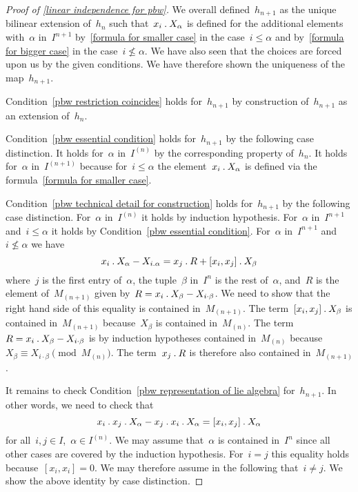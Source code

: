 \begin{proof}[Proof of \cref{linear independence for pbw}]
  We overall defined~$h_{n+1}$ as the unique bilinear extension of~$h_n$ such that~$x_i \mathbin{.} X_\alpha$ is defined for the additional elements with~$\alpha$ in~$I^{n+1}$ by~\eqref{formula for smaller case} in the case~$i \leq \alpha$ and by~\eqref{formula for bigger case} in the case~$i \nleq \alpha$.
  We have also seen that the choices are forced upon us by the given conditions.
  We have therefore shown the uniqueness of the map~$h_{n+1}$.
  
  Condition~\ref{pbw restriction coincides} holds for~$h_{n+1}$ by construction of~$h_{n+1}$ as an extension of~$h_n$.

  Condition~\ref{pbw essential condition} holds for~$h_{n+1}$ by the following case distinction.
  It holds for~$\alpha$ in~$I^{(n)}$ by the corresponding property of~$h_n$.
  It holds for~$\alpha$ in~$I^{(n+1)}$ because for~$i \leq \alpha$ the element~$x_i \mathbin{.} X_\alpha$ is defined via the formula~\eqref{formula for smaller case}. 

  Condition~\ref{pbw technical detail for construction} holds for~$h_{n+1}$ by the following case distinction.
  For~$\alpha$ in~$I^{(n)}$ it holds by induction hypothesis.
  For~$\alpha$ in~$I^{n+1}$ and~$i \leq \alpha$ it holds by Condition~\ref{pbw essential condition}.
  For~$\alpha$ in~$I^{n+1}$ and~$i \nleq \alpha$ we have
  \[
    x_i \mathbin{.} X_\alpha - X_{i.\alpha}
    =
    x_j \mathbin{.} R + [x_i, x_j] \mathbin{.} X_\beta
  \]
  where~$j$ is the first entry of~$\alpha$, the tuple~$\beta$ in~$I^n$ is the rest of~$\alpha$, and~$R$ is the element of~$M_{(n+1)}$ given by~$R = x_i \mathbin{.} X_\beta - X_{i \cdot \beta}$.
  We need to show that the right hand side of this equality is contained in~$M_{(n+1)}$.
  The term~$[x_i, x_j] \mathbin{.} X_\beta$ is contained in~$M_{(n+1)}$ because~$X_\beta$ is contained in~$M_{(n)}$.
  The term~$R = x_i \mathbin{.} X_\beta - X_{i \cdot \beta}$ is by induction hypotheses contained in~$M_{(n)}$ because $X_\beta \equiv X_{i \cdot \beta} \pmod{M_{(n)}}$.
  The term~$x_j \mathbin{.} R$ is therefore also contained in~$M_{(n+1)}$.

  It remains to check Condition~\ref{pbw representation of lie algebra} for~$h_{n+1}$.
  In other words, we need to check that
  \[
    x_i \mathbin{.} x_j \mathbin{.} X_\alpha - x_j \mathbin{.} x_i \mathbin{.} X_\alpha
    =
    [x_i, x_j] \mathbin{.} X_\alpha
  \]
  for all~$i, j \in I$,~$\alpha \in I^{(n)}$.
  We may assume that~$\alpha$ is contained in~$I^n$ since all other cases are covered by the induction hypothesis.
  For~$i = j$ this equality holds because~$[x_i, x_i] = 0$.
  We may therefore assume in the following that~$i \neq j$.
  We show the above identity by case distinction.
  

\end{proof}
